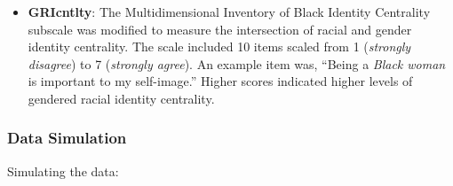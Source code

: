 \documentclass[
  11pt,
]{book}
\begin{document}
\begin{itemize}
\item
  \textbf{GRIcntlty}: The Multidimensional Inventory of Black Identity Centrality subscale \citep{sellers_multidimensional_nodate} was modified to measure the intersection of racial and gender identity centrality. The scale included 10 items scaled from 1 (\emph{strongly disagree}) to 7 (\emph{strongly agree}). An example item was, ``Being a \emph{Black woman} is important to my self-image.'' Higher scores indicated higher levels of gendered racial identity centrality.
\end{itemize}

\hypertarget{data-simulation-1}{%
\subsubsection{Data Simulation}\label{data-simulation-1}}

Simulating the data:
\end{document}

